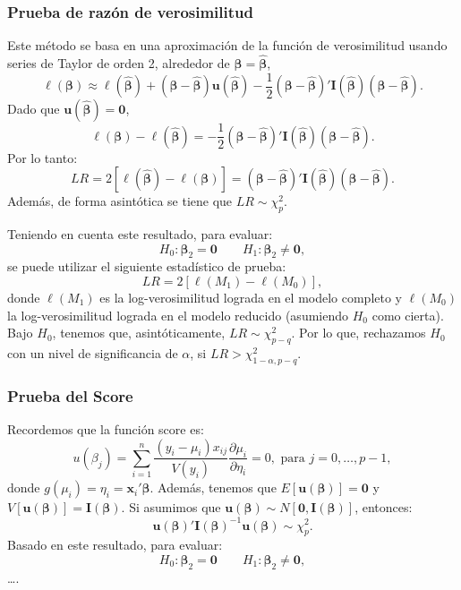 \documentclass[
]{article}
\begin{document}
\subsubsection{Prueba de razón de verosimilitud}\label{prueba-de-razuxf3n-de-verosimilitud}

Este método se basa en una aproximación de la función de verosimilitud usando series de Taylor de orden 2, alrededor de \(\boldsymbol \beta=\widehat{\boldsymbol \beta}\),
\[
\ell(\boldsymbol \beta) \approx \ell(\widehat{\boldsymbol \beta}) + (\boldsymbol \beta- \widehat{\boldsymbol \beta})\boldsymbol u(\widehat{\boldsymbol \beta})  - \frac{1}{2} (\boldsymbol \beta- \widehat{\boldsymbol \beta})'\boldsymbol I(\widehat{\boldsymbol \beta})(\boldsymbol \beta- \widehat{\boldsymbol \beta}).
\]
Dado que \(\boldsymbol u(\widehat{\boldsymbol \beta})=\boldsymbol 0\),
\[
\ell(\boldsymbol \beta) - \ell(\widehat{\boldsymbol \beta}) =  - \frac{1}{2} (\boldsymbol \beta- \widehat{\boldsymbol \beta})'\boldsymbol I(\widehat{\boldsymbol \beta})(\boldsymbol \beta- \widehat{\boldsymbol \beta}).
\]
Por lo tanto:
\[
LR= 2 \left[\ell(\widehat{\boldsymbol \beta}) - \ell(\boldsymbol \beta)\right] = (\boldsymbol \beta- \widehat{\boldsymbol \beta})'\boldsymbol I(\widehat{\boldsymbol \beta})(\boldsymbol \beta- \widehat{\boldsymbol \beta}).
\]
Además, de forma asintótica se tiene que \(LR\sim \chi^{2}_{p}\).

Teniendo en cuenta este resultado, para evaluar:
\[
H_{0}: \boldsymbol \beta_{2} = \boldsymbol 0\qquad H_{1}: \boldsymbol \beta_{2} \neq \boldsymbol 0,
\]
se puede utilizar el siguiente estadístico de prueba:
\[
LR = 2 [\ell(M_1) - \ell(M_0)],
\]
donde \(\ell(M_1)\) es la log-verosimilitud lograda en el modelo completo y \(\ell(M_0)\) la log-verosimilitud lograda en el modelo reducido (asumiendo \(H_0\) como cierta). Bajo \(H_0\), tenemos que, asintóticamente, \(LR \sim \chi^{2}_{p-q}\). Por lo que, rechazamos \(H_0\) con un nivel de significancia de \(\alpha\), si \(LR > \chi^{2}_{1-\alpha,p-q}\).

\subsubsection{Prueba del Score}\label{prueba-del-score}

Recordemos que la función score es:
\[
u(\beta_{j}) = \sum_{i=1}^{n} \frac{(y_{i}- \mu_{i})x_{ij}}{V(y_{i})}\frac{\partial \mu_{i}}{\partial \eta_{i}} = 0, \mbox{ para }j=0,\ldots,p-1,
\]
donde \(g(\mu_{i}) = \eta_{i} = \boldsymbol x_{i}'\boldsymbol \beta\). Además, tenemos que \(E[\boldsymbol u(\boldsymbol \beta)] =\boldsymbol 0\) y \(V[\boldsymbol u(\boldsymbol \beta)] = \boldsymbol I(\boldsymbol \beta)\). Si asumimos que \(\boldsymbol u(\boldsymbol \beta) \sim N[\boldsymbol 0, \boldsymbol I(\boldsymbol \beta)]\), entonces:
\[
\boldsymbol u(\boldsymbol \beta)'\boldsymbol I(\boldsymbol \beta)^{-1}\boldsymbol u(\boldsymbol \beta) \sim \chi^{2}_{p}.
\]
Basado en este resultado, para evaluar:
\[
H_{0}: \boldsymbol \beta_{2} = \boldsymbol 0\qquad H_{1}: \boldsymbol \beta_{2} \neq \boldsymbol 0,
\]
\ldots.
\end{document}
